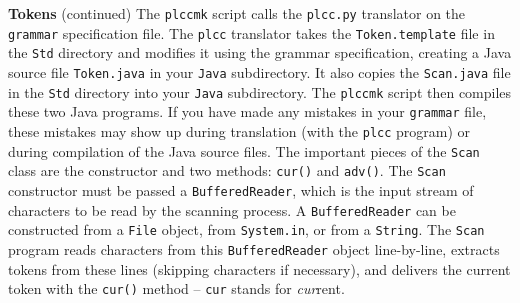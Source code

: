 \begin{minipage}[t]{\sw}
\slidenumber
\LARGE
{\bf Tokens} (continued)\exx
The \verb'plccmk' script calls the \verb'plcc.py' translator
on the \verb'grammar' specification file.
The \verb'plcc' translator takes the \verb'Token.template' file
in the \verb'Std' directory
and modifies it using the grammar specification,
creating a Java source file \verb'Token.java'
in your \verb'Java' subdirectory.
It also copies the \verb'Scan.java' file in the \verb'Std' directory
into your \verb'Java' subdirectory.
The \verb'plccmk' script then compiles these two Java programs.
If you have made any mistakes in your \verb'grammar' file,
these mistakes may show up during translation
(with the \verb'plcc' program)
or during compilation of the Java source files.\exx
The important pieces of the \verb'Scan' class
are the constructor and two methods: \verb'cur()' and \verb'adv()'.
The \verb'Scan' constructor must be passed
a \verb'BufferedReader',
which is the input stream of characters to be read by the scanning process.
A \verb'BufferedReader' can be constructed from a \verb'File' object,
from \verb'System.in', or from a \verb'String'.
The \verb'Scan' program reads characters
from this \verb'BufferedReader' object
line-by-line, extracts tokens from these lines
(skipping characters if necessary),
and delivers the current token with the \verb'cur()' method --
\verb'cur' stands for {\em cur}rent.\exx
\end{minipage}
